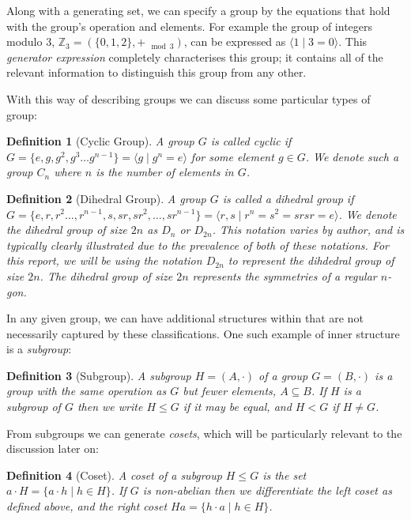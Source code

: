 \documentclass{article}
\theoremstyle{plain}
\theoremstyle{centered}
\newtheorem{definition}{Definition}
\newcommand{\camelia}{{\color{red}comment: }}
\newcommand{\bb}[1]{\mathbb{#1}}
\begin{document}
        Along with a generating set, we can specify a group by the equations that hold with the group's operation and elements.
        For example the group of integers modulo 3, $\bb{Z}_3 = (\{0, 1, 2\}, +_{\mod 3})$, can be expressed as $\langle 1 \mid 3 = 0\rangle$.
        This \textit{generator expression} completely characterises this group; it contains all of the relevant information to distinguish this group from any other.

        With this way of describing groups we can discuss some particular types of group:
        \begin{definition}[Cyclic Group]
                A group $G$ is called \textit{cyclic} if $G = \{e, g, g^2, g^3 \dots g^{n-1}\} = \langle g \mid g^n = e \rangle$ for some element $g \in G$. 
                We denote such a group $C_n$ where $n$ is the number of elements in $G$.
        \end{definition}

        \begin{definition}[Dihedral Group]
                A group $G$ is called a \textit{dihedral group} if $G = \{e, r, r^2 \dots, r^{n-1}, s, sr, sr^2, \dots, sr^{n-1}\} = \langle r, s \mid r^n = s^2 = srsr = e \rangle$. 
                We denote the dihedral group of size $2n$ as $D_n$ or $D_{2n}$.
                This notation varies by author, and is typically clearly illustrated due to the prevalence of both of these notations.
                For this report, we will be using the notation $D_{2n}$ to represent the dihdedral group of size $2n$.
                The dihedral group of size $2n$ represents the symmetries of a regular $n$-gon.
        \end{definition}

        In any given group, we can have additional structures within that are not necessarily captured by these classifications.
        One such example of inner structure is a \textit{subgroup}:
        \begin{definition}[Subgroup]\label{def:subgroup}
                A \textit{subgroup} $H = (A, \cdot)$ of a group $G = (B, \cdot)$ is a group with the same operation as $G$ but fewer elements, $A \subseteq B$.
                If $H$ is a subgroup of $G$ then we write $H \leqslant G$ if it may be equal, and $H < G$ if $H \neq G$.
        \end{definition}
        From subgroups we can generate \textit{cosets}, which will be particularly relevant to the discussion later on:
        \begin{definition}[Coset]\label{def:coset}
                A \textit{coset} of a subgroup $H \leqslant G$ is the set $a \cdot H = \{a \cdot h \mid h \in H\}$. If $G$ is non-abelian then we differentiate the \textit{left} coset as defined above, and the \textit{right} coset $Ha = \{h \cdot a \mid h \in H\}$.
        \end{definition}
\end{document}
